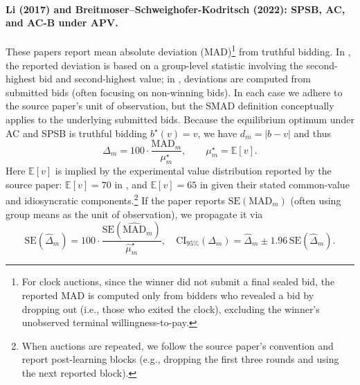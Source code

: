 \paragraph{Li (2017) and Breitmoser--Schweighofer-Kodritsch (2022): SPSB, AC, and AC-B under APV.}
These papers \citep{li2017obviously,breitmoser2022obviousness} report mean absolute deviation (MAD)\footnote{For clock auctions, since the winner did not submit a final sealed bid, the reported MAD is computed only from bidders who revealed a bid by dropping out (i.e., those who exited the clock), excluding the winner's unobserved terminal willingness-to-pay.}
from truthful bidding. In \citet{li2017obviously}, the reported deviation is based on a group-level statistic involving the second-highest bid and second-highest value; in \citet{breitmoser2022obviousness}, deviations are computed from submitted bids (often focusing on non-winning bids). In each case we adhere to the source paper's unit of observation, but the SMAD definition conceptually applies to the underlying submitted bids.
Because the equilibrium optimum under AC and SPSB is truthful bidding $b^\star(v)=v$, we have $d_m=|b-v|$ and thus
\[
\Delta_m = 100\cdot \frac{\mathrm{MAD}_m}{\mu_m^\star},
\qquad
\mu_m^\star=\mathbb E[v].
\]
Here $\mathbb E[v]$ is implied by the experimental value distribution reported by the source paper: $\mathbb E[v]=70$ in \citet{li2017obviously}, and $\mathbb E[v]=65$ in \citet{breitmoser2022obviousness} given their stated common-value and idiosyncratic components.\footnote{When auctions are repeated, we follow the source paper's convention and report post-learning blocks (e.g., dropping the first three rounds and using the next reported block).}
If the paper reports $\mathrm{SE}(\mathrm{MAD}_m)$ (often using group means as the unit of observation), we propagate it via
\[
\mathrm{SE}(\widehat{\Delta}_m)=100\cdot \frac{\mathrm{SE}(\widehat{\mathrm{MAD}}_m)}{\widehat{\mu}_m^\star},
\quad
\mathrm{CI}_{95\%}(\Delta_m)=\widehat{\Delta}_m \pm 1.96\,\mathrm{SE}(\widehat{\Delta}_m).
\]

